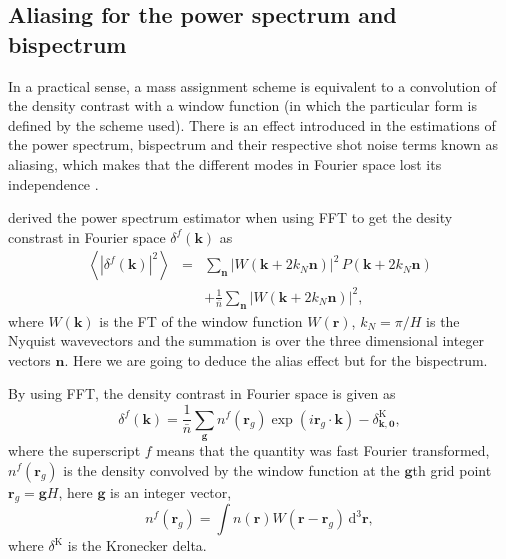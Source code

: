 \documentclass[a4paper,fleqn,usenatbib]{mnras}
\begin{document}



\subsection{Aliasing for the power spectrum and bispectrum}
\label{sec:theory:aliasing}

In a practical sense, a mass assignment scheme is equivalent to a convolution of 
the density contrast with a window function (in which the particular form is 
defined by the scheme used). There is an effect introduced in the estimations 
of the power spectrum, bispectrum and their respective shot noise terms known 
as aliasing, which makes that the different modes in Fourier space lost its
independence \citep{HockneyEastwood1981,Jing2005}.

\cite{Jing2005} derived the power spectrum estimator when using FFT to get the 
desity constrast in Fourier space $\delta^f(\mathbf{k})$ as
\begin{eqnarray}
  \left\langle\left|\delta^f(\mathbf{k})\right|^2\right\rangle 
  &=& \sum_\mathbf{n} 
  \left|W(\mathbf{k}+2k_N\mathbf{n})\right|^2\,P(\mathbf{k}+2k_N\mathbf{n}) \nonumber \\
  & & +\frac{1}{\bar{n}} \sum_\mathbf{n} \left|W(\mathbf{k}+2k_N\mathbf{n})\right|^2, \label{eq:JingAliasing}
\end{eqnarray}
where $W(\mathbf{k})$ is the FT of the window function $W(\mathbf{r})$, $k_N=\pi/H$ is the Nyquist 
wavevectors and the summation is over the three dimensional integer vectors 
$\mathbf{n}$. Here we are 
going to deduce the alias effect but for the bispectrum.

By using FFT, the density contrast in Fourier space is given as \citep{Jing2005}
\begin{equation}
  \delta^f(\mathbf{k}) = \frac{1}{\bar{n}}\sum_\mathbf{g} n^f(\mathbf{r}_g)\exp(i\mathbf{r}_g\cdot\mathbf{k})
  -\delta^\text{K}_{\mathbf{k},\mathbf{0}} \label{eq:deltaf},
\end{equation}
where the superscript $f$ means that the quantity was fast Fourier transformed, $n^f(\mathbf{r}_g)$
is the density convolved by the window function at the $\mathbf{g}$th grid point 
$\mathbf{r}_g=\mathbf{g}H$, here $\mathbf{g}$ is an integer vector,
\begin{equation}
  n^f(\mathbf{r}_g) = \int n(\mathbf{r}) 
  W(\mathbf{r}-\mathbf{r}_g)\,\text{d}^3\mathbf{r}, \label{eq:nf}
\end{equation}
where $\delta^\text{K}$ is the Kronecker delta.
\end{document}
